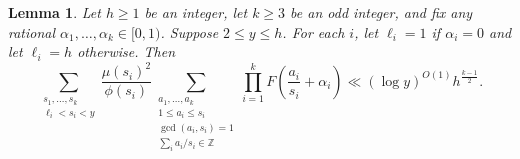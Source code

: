 \documentclass[10pt,a4paper]{amsart}
\newtheorem{lemma}{Lemma}
\newcommand{\ogcd}[2]{\gcd(#1,#2)}
\begin{document}
\begin{lemma}\label{lem:bounds-on-s-i-sums-with-alpha-shifts}
Let $h \ge 1$ be an integer, let $k \ge 3$ be an odd integer, and fix any rational $\alpha_1, \dots, \alpha_k \in [0,1)$. Suppose $2\leq y\leq h$. For each $i$, let $\ell_i = 1$ if $\alpha_i = 0$ and let $\ell_i = h$ otherwise. Then
\begin{equation*}
    \sum_{\substack{s_1, \dots, s_k \\ \ell_i < s_i < y}} \frac{\mu(s_i)^2}{\phi(s_i)} \sum_{\substack{a_1, \dots, a_k \\ 1 \le a_i \le s_i \\ \ogcd{a_i}{s_i} = 1 \\ \sum_i a_i/s_i \in \mathbb Z}} \prod_{i=1}^k F\left(\frac{a_i}{s_i} + \alpha_i\right) \ll (\log y)^{O(1)}h^{\tfrac{k-1}{2}}.
\end{equation*}
\end{lemma}
\end{document}

